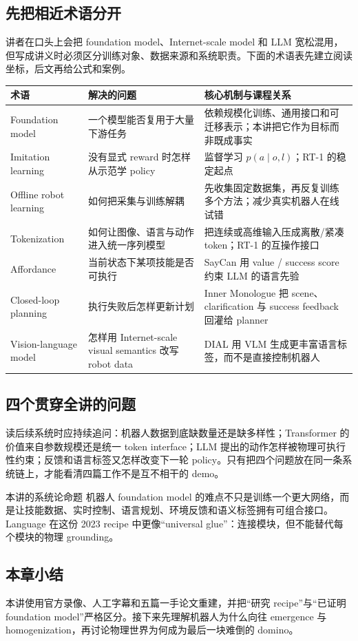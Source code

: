 \subsection{先把相近术语分开}

讲者在口头上会把 foundation model、Internet-scale model 和 LLM 宽松混用，但写成讲义时必须区分训练对象、数据来源和系统职责。下面的术语表先建立阅读坐标，后文再给公式和案例。

\begin{longtable}{L{0.22\textwidth}L{0.30\textwidth}L{0.38\textwidth}}
\toprule
术语 & 解决的问题 & 核心机制与课程关系 \\
\midrule
Foundation model & 一个模型能否复用于大量下游任务 & 依赖规模化训练、通用接口和可迁移表示；本讲把它作为目标而非既成事实 \\
Imitation learning & 没有显式 reward 时怎样从示范学 policy & 监督学习 $p(a\mid o,l)$；RT-1 的稳定起点 \\
Offline robot learning & 如何把采集与训练解耦 & 先收集固定数据集，再反复训练多个方法；减少真实机器人在线试错 \\
Tokenization & 如何让图像、语言与动作进入统一序列模型 & 把连续或高维输入压成离散/紧凑 token；RT-1 的互操作接口 \\
Affordance & 当前状态下某项技能是否可执行 & SayCan 用 value / success score 约束 LLM 的语言先验 \\
Closed-loop planning & 执行失败后怎样更新计划 & Inner Monologue 把 scene、clarification 与 success feedback 回灌给 planner \\
Vision-language model & 怎样用 Internet-scale visual semantics 改写 robot data & DIAL 用 VLM 生成更丰富语言标签，而不是直接控制机器人 \\
\bottomrule
\end{longtable}

\subsection{四个贯穿全讲的问题}

读后续系统时应持续追问：机器人数据到底缺数量还是缺多样性；Transformer 的价值来自参数规模还是统一 token interface；LLM 提出的动作怎样被物理可执行性约束；反馈和语言标签又怎样改变下一轮 policy。只有把四个问题放在同一条系统链上，才能看清四篇工作不是互不相干的 demo。

\begin{importantbox}{本讲的系统论命题}
机器人 foundation model 的难点不只是训练一个更大网络，而是让技能数据、实时控制、语言规划、环境反馈和语义标签拥有可组合接口。Language 在这份 2023 recipe 中更像“universal glue”：连接模块，但不能替代每个模块的物理 grounding。
\end{importantbox}

\subsection{本章小结}

本讲使用官方录像、人工字幕和五篇一手论文重建，并把“研究 recipe”与“已证明 foundation model”严格区分。接下来先理解机器人为什么向往 emergence 与 homogenization，再讨论物理世界为何成为最后一块难倒的 domino。

